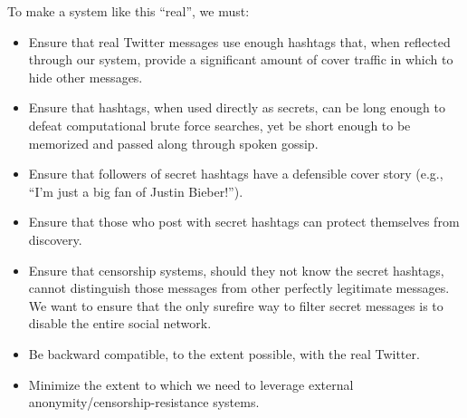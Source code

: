 To make a system like this ``real'', we must:
\begin{itemize}
\item Ensure that real Twitter messages use enough hashtags that, when reflected through our system, provide a significant amount of cover traffic in which to hide other messages.
\item Ensure that hashtags, when used directly as secrets, can be long enough to defeat computational brute force searches, yet be short enough to be memorized and passed along through spoken gossip.
\item Ensure that followers of secret hashtags have a defensible cover story (e.g., ``I'm just a big fan of Justin Bieber!'').
\item Ensure that those who post with secret hashtags can protect themselves from discovery.
\item Ensure that censorship systems, should they not know the secret hashtags, cannot distinguish those messages from other perfectly legitimate messages. We want to ensure that the only surefire way to filter secret messages is to disable the entire social network.
\item Be backward compatible, to the extent possible, with the real Twitter.
\item Minimize the extent to which we need to leverage external anonymity/censorship-resistance systems.
\end{itemize}
\fi

% 
% 	
% 
% 
% 
% 
% 
% 
% 
% 
% 
% 
